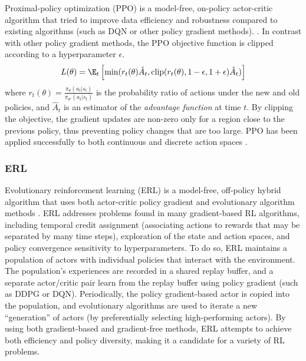 \documentclass[twocolumn, aps, 10pt]{revtex4-2}
\begin{document}
Proximal-policy optimization (PPO) is a model-free, on-policy actor-critic algorithm that tried to improve data efficiency and robustness compared to existing algorithms (such as DQN or other policy gradient methods).
\cite{schulman2017proximal}.
In contrast with other policy gradient methods, the PPO objective function is clipped according to a hyperparameter $\epsilon$.
\begin{equation}\label{eq:ppo_loss}
    L(\theta) = \E_t \left[\min(
        r_t(\theta)\hat{A}_t,
        \text{clip}(r_t(\theta), 1-\epsilon, 1+\epsilon) \hat{A}_t
    )\right]
\end{equation}
where
$r_t(\theta) = \frac{\pi_\theta(a_t|s_t)}{\pi_{\theta'}(a_t|s_t)}$ is the probability ratio of actions under the new and old policies, and $\hat{A}_t$ is an estimator of the \emph{advantage function} at time $t$. By clipping the objective, the gradient updates are non-zero only for a region close to the previous policy, thus preventing policy changes that are too large.
PPO has been applied successfully to both continuous and discrete action spaces%
.



\subsubsection{ERL}

Evolutionary reinforcement learning (ERL) is a model-free, off-policy hybrid algorithm that uses both actor-critic policy gradient and evolutionary algorithm methods \cite{khadka2018evolutionguided}. ERL addresses problems found in many  gradient-based RL algorithms, including temporal credit assignment (associating actions to rewards that may be separated by many time steps), exploration of the state and action spaces, and policy convergence sensitivity to hyperparameters. To do so, ERL maintains a population of actors with individual policies that interact with the environment. The population's experiences are recorded in a shared replay buffer, and a separate actor/critic pair learn from the replay buffer using policy gradient (such as DDPG or DQN). Periodically, the policy gradient-based actor is copied into the population, and evolutionary algorithms are used to iterate a new ``generation'' of actors (by preferentially selecting high-performing actors). By using both gradient-based and gradient-free methods, ERL attempts to achieve both efficiency and policy diversity, making it a candidate for a variety of RL problems.
\end{document}
